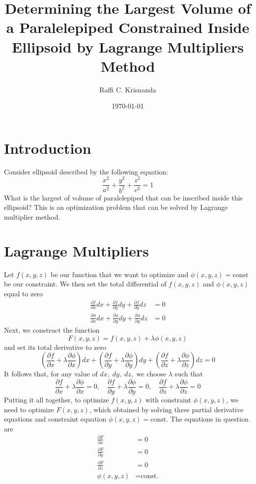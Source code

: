 \documentclass[twocolumn]{article}
\title{Determining the Largest Volume of a Paralelepiped Constrained Inside Ellipsoid by Lagrange Multipliers Method}
\author{Raffi C. Krisnanda}
\date{\today}
\begin{document}
\maketitle
\thispagestyle{empty}

\section{Introduction}
Consider ellipsoid described by the following equation:
\begin{equation}
    \frac{x^2}{a^2}+\frac{y^2}{b^2}+\frac{z^2}{c^2}=1
\end{equation}
What is the largest of volume of paralelepiped that can be inscribed inside this ellipsoid? This is an optimization problem that can be solved by Lagrange multiplier method.

\section{Lagrange Multipliers}
Let $f(x,y,z)$ be our function that we want to optimize and $\phi(x,y,z)=\text{const}$ be our constraint. We then set the total differential of $f(x,y,z)$ and $\phi(x,y,z)$ equal to zero
\begin{align}
    \frac{\partial f}{\partial x}dx + \frac{\partial f}{\partial y}dy + \frac{\partial f}{\partial y}dz&=0\\
    \frac{\partial \phi}{\partial x}dx + \frac{\partial \phi}{\partial y}dy + \frac{\partial \phi}{\partial y}dz&=0
\end{align}
Next, we construct the function
\begin{equation}
    F(x,y,z)=f(x,y,z)+\lambda\phi(x,y,z)
\end{equation}
and set its total derivative to zero
\begin{equation}
    \left(\frac{\partial f}{\partial x}+ \lambda\frac{\partial \phi}{\partial x}\right)dx + \left(\frac{\partial f}{\partial y}+ \lambda\frac{\partial \phi}{\partial y}\right)dy + \left(\frac{\partial f}{\partial z}+ \lambda\frac{\partial \phi}{\partial z}\right)dz = 0
\end{equation}
It follows that, for any value of $dx,\;dy,\;dz,$ we choose $\lambda$ such that 
\begin{equation}
    \frac{\partial f}{\partial x}+ \lambda\frac{\partial \phi}{\partial x}=0,\quad \frac{\partial f}{\partial y}+ \lambda\frac{\partial \phi}{\partial y}=0,\quad \frac{\partial f}{\partial z}+ \lambda\frac{\partial \phi}{\partial z}=0
\end{equation}
Putting it all together, to optimize $f(x,y,z)$ with constraint $\phi(x,y,z)$, we need to optimize $F(x,y,z)$, which obtained by solving three partial derivative equations and constraint equation $\phi(x,y,z)=\text{const}$. The equations in question are
\begin{align}
    \frac{\partial F}{\partial x}&=0\\
    \frac{\partial F}{\partial y}&=0\\
    \frac{\partial F}{\partial z}&=0\\
    \phi(x,y,z)&=\text{const.}
\end{align}
\end{document}
